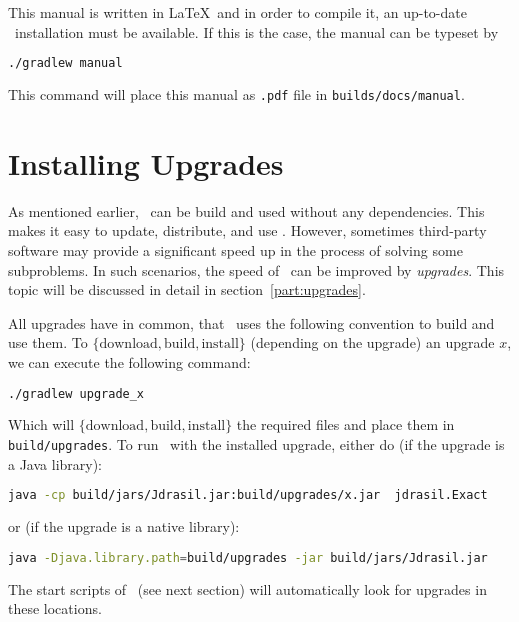 \documentclass[a4paper, ukenglish, twoside, openright]{jdrasilmanual}
\begin{document}
This manual is written in \LaTeX\ and in order to compile it, an
up-to-date \LuaLaTeX\ installation must be available. If this is the
case, the manual can be typeset by
\begin{lstlisting}[language=bash]
  ./gradlew manual
\end{lstlisting}
This command will place this manual as \texttt{.pdf} file in
\texttt{builds/docs/manual}.
\section{Installing Upgrades}
As mentioned earlier, \Jdrasil\ can be build and used without any
dependencies. This makes it easy to update, distribute, and use
\Jdrasil. However, sometimes third-party software may provide a
significant speed up in the process of solving some subproblems. In
such scenarios, the speed of \Jdrasil\ can be improved by
\emph{upgrades}. This topic will be discussed in detail in
section~\ref{part:upgrades}.

All upgrades have in common, that \Jdrasil\ uses the following
convention to build and use them. To $\{\text{download}, \text{build},
\text{install}\}$ (depending on the upgrade) an upgrade $x$, we can
execute the following command:
\begin{lstlisting}[language=bash]
  ./gradlew upgrade_x
\end{lstlisting}
Which will $\{\text{download}, \text{build},
\text{install}\}$ the required files and place them in
\texttt{build/upgrades}.
To run \Jdrasil\ with the installed upgrade, either do (if the upgrade is
a Java library):
\begin{lstlisting}[language=bash]
  java -cp build/jars/Jdrasil.jar:build/upgrades/x.jar  jdrasil.Exact
\end{lstlisting}
or (if the upgrade is a native library):
\begin{lstlisting}[language=bash]
  java -Djava.library.path=build/upgrades -jar build/jars/Jdrasil.jar
\end{lstlisting}
The start scripts of \Jdrasil\ (see next section) will automatically look for upgrades in
these locations.
\end{document}
